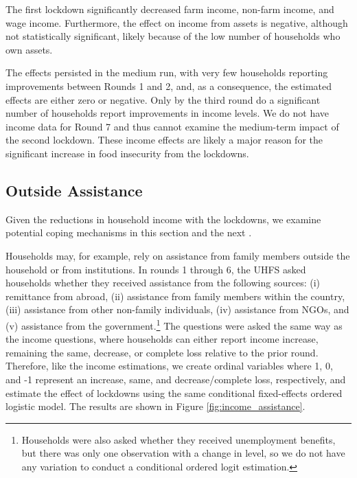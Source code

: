 \documentclass{wber}
\begin{document}
The first lockdown significantly decreased farm income, non-farm income,
and wage income. Furthermore, the effect on income from assets is
negative, although not statistically significant, likely because of the
low number of households who own assets.

The effects persisted in the medium run, with very few households
reporting improvements between Rounds 1 and 2, and, as a consequence,
the estimated effects are either zero or negative. Only by the third
round do a significant number of households report improvements in
income levels. We do not have income data for Round 7 and thus cannot
examine the medium-term impact of the second lockdown. These income
effects are likely a major reason for the significant increase in food
insecurity from the lockdowns.

\subsection{Outside Assistance}\label{outside-assistance}

Given the reductions in household income with the lockdowns, we examine
potential coping mechanisms in this section and the next
\citep{Morduch1995, Townsend1994}.

Households may, for example, rely on assistance from family members
outside the household or from institutions. In rounds 1 through 6, the
UHFS asked households whether they received assistance from the
following sources: (i) remittance from abroad, (ii) assistance from
family members within the country, (iii) assistance from other
non-family individuals, (iv) assistance from NGOs, and (v) assistance
from the government.\footnote{Households were also asked whether they
  received unemployment benefits, but there was only one observation
  with a change in level, so we do not have any variation to conduct a
  conditional ordered logit estimation.} The questions were asked the
same way as the income questions, where households can either report
income increase, remaining the same, decrease, or complete loss relative
to the prior round. Therefore, like the income estimations, we create
ordinal variables where 1, 0, and -1 represent an increase, same, and
decrease/complete loss, respectively, and estimate the effect of
lockdowns using the same conditional fixed-effects ordered logistic
model. The results are shown in Figure \ref{fig:income_assistance}.
\end{document}
